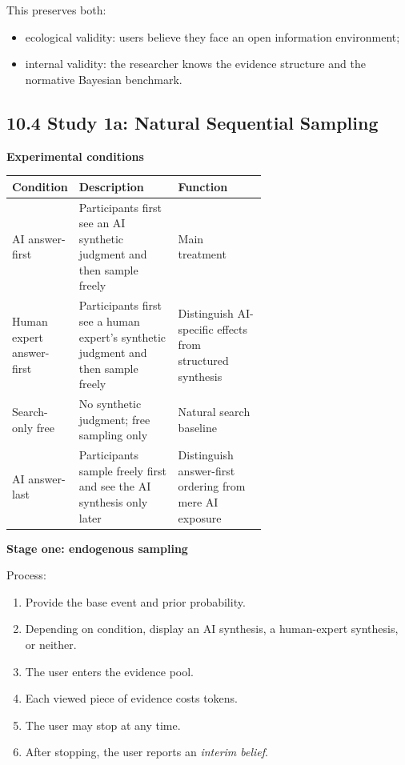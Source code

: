 This preserves both:
\begin{itemize}[leftmargin=1.5em]
\item ecological validity: users believe they face an open information environment;
\item internal validity: the researcher knows the evidence structure and the normative Bayesian benchmark.
\end{itemize}

\subsection*{10.4 Study 1a: Natural Sequential Sampling}

\textbf{Experimental conditions}

\begin{center}
\begin{tabularx}{\linewidth}{>{\raggedright\arraybackslash}p{0.24\linewidth} >{\raggedright\arraybackslash}p{0.39\linewidth} >{\raggedright\arraybackslash}X}
\toprule
\textbf{Condition} & \textbf{Description} & \textbf{Function} \\
\midrule
AI answer-first & Participants first see an AI synthetic judgment and then sample freely & Main treatment \\
Human expert answer-first & Participants first see a human expert's synthetic judgment and then sample freely & Distinguish AI-specific effects from structured synthesis \\
Search-only free & No synthetic judgment; free sampling only & Natural search baseline \\
AI answer-last & Participants sample freely first and see the AI synthesis only later & Distinguish answer-first ordering from mere AI exposure \\
\bottomrule
\end{tabularx}
\end{center}

\textbf{Stage one: endogenous sampling}

Process:
\begin{enumerate}[leftmargin=1.8em]
\item Provide the base event and prior probability.
\item Depending on condition, display an AI synthesis, a human-expert synthesis, or neither.
\item The user enters the evidence pool.
\item Each viewed piece of evidence costs tokens.
\item The user may stop at any time.
\item After stopping, the user reports an \emph{interim belief}.
\end{enumerate}

